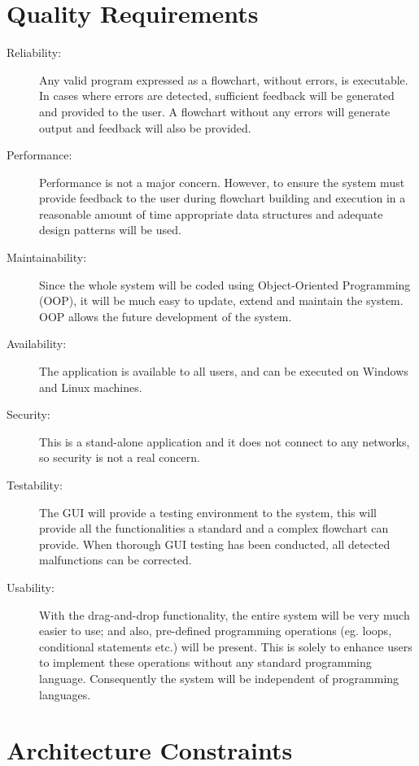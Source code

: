 \section{Quality Requirements}
\begin{description}
  \item[Reliability:]
  	Any valid program expressed as a flowchart, without errors, is executable. In cases where errors are detected, sufficient feedback will be generated and provided to the user. A flowchart without any errors will generate output and feedback will also be provided.
 

  \item[Performance:]
  Performance is not a major concern. However, to ensure the system must provide feedback to the user during flowchart building and execution in a reasonable amount of time appropriate data structures and adequate design patterns will be used.

  \item[Maintainability:] 
  Since the whole system will be coded using Object-Oriented Programming (OOP), it will be much easy to update, extend and maintain the system. OOP allows the future development of the system.

  \item[Availability:]
  The application is available to all users, and can be executed on Windows and Linux machines.

  \item[Security:]
  This is a stand-alone application and it does not connect to any networks, so security is not a real concern.

  \item[Testability:]
  The GUI will provide a testing environment to the system, this will provide all the functionalities a standard and a complex flowchart can provide. When thorough GUI testing has been conducted, all detected malfunctions can be corrected.

  \item[Usability:]
  With the drag-and-drop functionality, the entire system will be very much easier to use; and also, pre-defined programming operations (eg. loops, conditional statements etc.) will be present. This is solely to enhance users to implement these operations without any standard programming language. Consequently the system will be independent of programming languages.
  

\end{description}
\section{Architecture Constraints}

